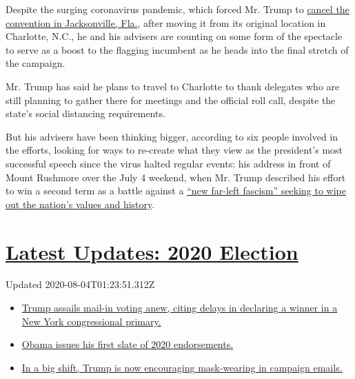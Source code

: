 Despite the surging coronavirus pandemic, which forced Mr. Trump to
\href{https://www.nytimes3xbfgragh.onion/2020/07/23/us/politics/jacksonville-rnc.html}{cancel
the convention in Jacksonville, Fla.}, after moving it from its original
location in Charlotte, N.C., he and his advisers are counting on some
form of the spectacle to serve as a boost to the flagging incumbent as
he heads into the final stretch of the campaign.

Mr. Trump has said he plans to travel to Charlotte to thank delegates
who are still planning to gather there for meetings and the official
roll call, despite the state's social distancing requirements.

But his advisers have been thinking bigger, according to six people
involved in the efforts, looking for ways to re-create what they view as
the president's most successful speech since the virus halted regular
events: his address in front of Mount Rushmore over the July 4 weekend,
when Mr. Trump described his effort to win a second term as a battle
against a
\href{https://www.nytimes3xbfgragh.onion/2020/07/03/us/politics/trump-coronavirus-mount-rushmore.html}{``new
far-left fascism'' seeking to wipe out the nation's values and history}.

\hypertarget{latest-updates-2020-election}{%
\section{\texorpdfstring{\href{https://www.nytimes3xbfgragh.onion/2020/08/03/us/elections/biden-vs-trump.html?action=click\&pgtype=Article\&state=default\&region=MAIN_CONTENT_1\&context=storylines_live_updates}{Latest
Updates: 2020
Election}}{Latest Updates: 2020 Election}}\label{latest-updates-2020-election}}

Updated 2020-08-04T01:23:51.312Z

\begin{itemize}
\tightlist
\item
  \href{https://www.nytimes3xbfgragh.onion/2020/08/03/us/elections/biden-vs-trump.html?action=click\&pgtype=Article\&state=default\&region=MAIN_CONTENT_1\&context=storylines_live_updates\#link-6494b448}{Trump
  assails mail-in voting anew, citing delays in declaring a winner in a
  New York congressional primary.}
\item
  \href{https://www.nytimes3xbfgragh.onion/2020/08/03/us/elections/biden-vs-trump.html?action=click\&pgtype=Article\&state=default\&region=MAIN_CONTENT_1\&context=storylines_live_updates\#link-3de249e6}{Obama
  issues his first slate of 2020 endorsements.}
\item
  \href{https://www.nytimes3xbfgragh.onion/2020/08/03/us/elections/biden-vs-trump.html?action=click\&pgtype=Article\&state=default\&region=MAIN_CONTENT_1\&context=storylines_live_updates\#link-54e34d20}{In
  a big shift, Trump is now encouraging mask-wearing in campaign
  emails.}
\end{itemize}

